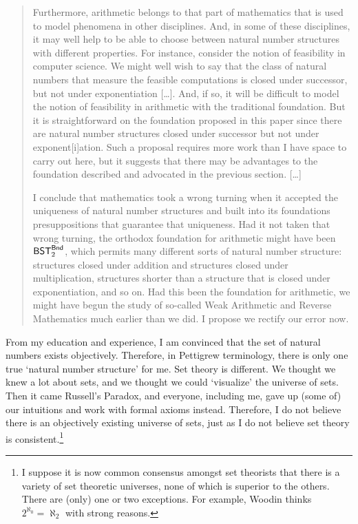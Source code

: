\documentclass{bhamthesis}
\theoremstyle{definition}
\newcommand{\mar}[1]{\marginpar{\raggedright#1}}
\begin{document}
\begin{quotation}
 Furthermore, arithmetic belongs to that part of mathematics that
 is used to model phenomena in other disciplines.  And, in some of
 these disciplines, it may well help to be able to choose between
 natural number structures with different properties.  For
 instance, consider the notion of feasibility in computer science.
 We might well wish to say that the class of natural numbers that
 measure the feasible computations is closed under successor, but
 not under exponentiation [\ldots].  And, if so, it will be
 difficult to model the notion of feasibility in arithmetic with
 the traditional foundation.  But it is straightforward on the
 foundation proposed in this paper since there are natural number
 structures closed under successor but not under exponent[i]ation.
 Such a proposal requires more work than I have space to carry out
 here, but it suggests that there may be advantages to the
 foundation described and advocated in the previous section.
 [\ldots]

 I conclude that mathematics took a wrong turning when it accepted
 the uniqueness of natural number structures and built into its
 foundations presuppositions that guarantee that uniqueness.  Had
 it not taken that wrong turning, the orthodox foundation for
 arithmetic might have been $\mathsf{BST}^{\sf Bnd}_2$, which
 permits many different sorts of natural number structure:
 structures closed under addition and structures closed under
 multiplication, structures shorter than a structure that is
 closed under exponentiation, and so on. Had this been the
 foundation for arithmetic, we might have begun the study of
 so-called Weak Arithmetic and Reverse Mathematics much earlier
 than we did.  I propose we rectify our error now.
\end{quotation}

From my education and experience, I am convinced that the set of
natural numbers exists objectively.  Therefore, in Pettigrew
terminology, there is only one true `natural number structure' for
me.  Set theory is different.  We thought we knew a lot about
sets, and we thought we could `visualize' the universe of sets.
Then it came Russell's Paradox, and everyone, including me, gave
up (some of) our intuitions and work with formal axioms instead.
Therefore, I do not believe there is an objectively existing
universe of sets, just as I do not believe set theory is
consistent.\footnote{I suppose it is now common consensus amongst
set theorists that there is a variety of set theoretic universes,
none of which is superior to the others.  There are (only) one or
two exceptions.  For example, Woodin thinks
$2^{\aleph_0}=\aleph_2$ with strong reasons.}\mar{This is a widow,
probably caused by the footnote.}  %
\end{document}
